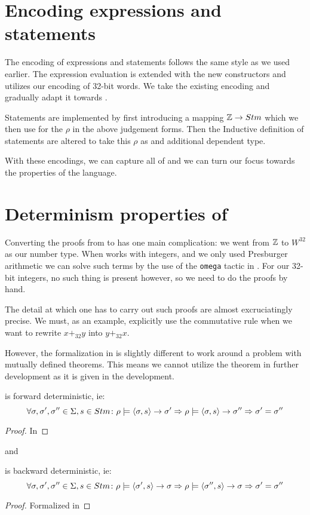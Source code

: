 \section{Encoding expressions and statements}

The encoding of expressions and statements follows the same style as
we used earlier. The expression evaluation is extended with the new
constructors and utilizes our encoding of 32-bit words. We take the
existing encoding and gradually adapt it towards \januso{}.

Statements are implemented by first introducing a mapping $\mathbb{Z} \to
Stm$ which we then use for the $\rho$ in the above judgement
forms. Then the Inductive definition of statements are altered to take
this $\rho$ as and additional dependent type.

With these encodings, we can capture all of \januso{} and we can turn
our focus towards the properties of the language.

\section{Determinism properties of \januso{}}

Converting the proofs from \janusz{} to \januso{} has one main
complication: we went from $\mathbb{Z}$ to $W^{32}$ as our number type. When
\coq{} works with integers, and we only used Presburger arithmetic we
can solve such terms by the use of the \texttt{omega} tactic in
\coq{}. For our 32-bit integers, no such thing is present however, so
we need to do the proofs by hand.

The detail at which one has to carry out such proofs are almost
excruciatingly precise. We must, as an example, explicitly use the
commutative rule when we want to rewrite $x +_{32} y$ into $y +_{32}
x$.

However, the formalization in \coq{} is slightly different to work
around a problem with mutually defined theorems. This means we cannot
utilize the theorem in further development as it is given in the
development.
\begin{thm}
\label{thm:j1-fwd-det}
  \januso{} is forward deterministic, ie:
  \begin{equation*}
    \forall \sigma, \sigma', \sigma'' \in \Sigma, s \in Stm \colon
    \rho |= \langle \sigma, s \rangle -> \sigma' => \rho |= \langle \sigma, s \rangle -> \sigma'' => \sigma' = \sigma''
  \end{equation*}
\end{thm}
\begin{proof}
  In \coq{}
\end{proof}
and
\begin{thm}
\label{thm:j1-bwd-det}
  \januso{} is backward deterministic, ie:
  \begin{equation*}
    \forall \sigma, \sigma', \sigma'' \in \Sigma, s \in Stm \colon
    \rho |= \langle \sigma', s \rangle -> \sigma => \rho |= \langle \sigma'', s \rangle -> \sigma => \sigma' = \sigma''
  \end{equation*}
\end{thm}
\begin{proof}
  Formalized in \coq{}
\end{proof}

